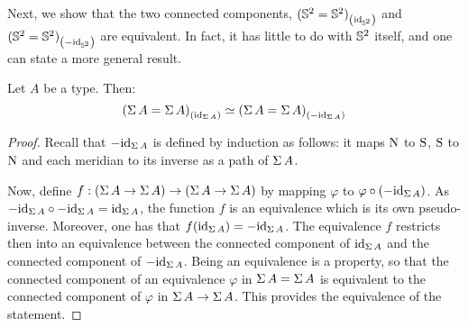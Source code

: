 \documentclass[english,a4paper]{lmcs}
\begin{document}
Next, we show that the two connected components,
$\conncomp{(\Sp = \Sp)}{\id_\Sp}$ and
$\conncomp{(\Sp = \Sp)}{-\id_\Sp}$ are equivalent.
In fact, it has little to do with $\Sp$ itself, and one can state a more
general result.
\begin{prop} \label{prop:equiv-susp-comp}
  Let $A$ be a type. Then:
  \begin{displaymath}
    \conncomp{(\susp A = \susp A)}{\id_{\susp A}} \weq \conncomp{(\susp A = \susp A)}{-\id_{\susp A}}
  \end{displaymath}
\end{prop}
\begin{proof}
  Recall that $-\id_{\susp A}$ is defined by induction as follows: it maps $\north$
  to $\south$, $\south$ to $\north$ and each meridian to its inverse as a path of $\susp A$.

  Now, define $f:{({\susp A} \to {\susp A})} \to ({\susp A} \to {\susp A})$ by mapping
  $\varphi$ to $\varphi\circ(-\id_{\susp A})$.
  As $-\id_{\susp A}\circ -\id_{\susp A} = \id_{\susp A}$, the function $f$ is
  an equivalence which is its own pseudo-inverse. Moreover, one has that
  $f(\id_{\susp A}) = -\id_{\susp A}$.
  The equivalence $f$ restricts then into an equivalence between the connected
  component of $\id_{\susp A}$ and the connected component of $-\id_{\susp A}$.
  Being an equivalence is a property, so that the connected component of an
  equivalence $\varphi$ in $\susp A = \susp A$ is equivalent to the connected
  component of $\varphi$ in ${\susp A} \to {\susp A}$. This provides the
  equivalence of the statement.
\end{proof}
\end{document}
